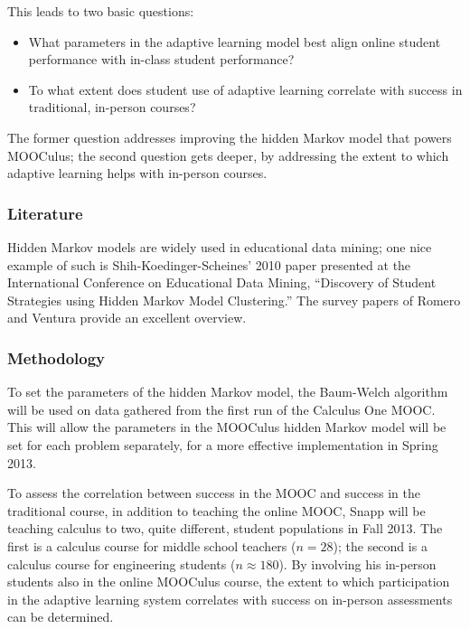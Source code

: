 \documentclass[12pt]{article}
\begin{document}
This leads to two basic questions:
\begin{itemize}
\item What parameters in the adaptive
  learning model best align online student performance with in-class
  student performance?
\item To what extent does student use
  of adaptive learning correlate with success in traditional,
  in-person courses?
\end{itemize}
The former question addresses improving the hidden Markov model that
powers MOOCulus; the second question gets deeper, by addressing the
extent to which adaptive learning helps with in-person courses.

\subsubsection*{Literature}

Hidden Markov models are widely used in educational data mining; one
nice example of such is Shih-Koedinger-Scheines' 2010 paper
presented at the International Conference on Educational Data Mining,
``Discovery of Student Strategies using Hidden Markov Model
Clustering.''  The survey papers of Romero and Ventura provide an
excellent overview.

\subsubsection*{Methodology}

To set the parameters of the hidden Markov model, the Baum-Welch
algorithm will be used on data gathered from the first run of the
Calculus One MOOC. This will allow the parameters in the MOOCulus
hidden Markov model will be set for each problem separately, for a
more effective implementation in Spring 2013.

To assess the correlation between success in the MOOC and success in
the traditional course, in addition to teaching the online MOOC, Snapp
will be teaching calculus to two, quite different, student populations
in Fall 2013.  The first is a calculus course for middle school
teachers ($n=28$); the second is a calculus course for engineering
students ($n\approx 180$).  By involving his in-person students also
in the online MOOCulus course, the extent to which participation in
the adaptive learning system correlates with success on in-person
assessments can be determined.
\end{document}
